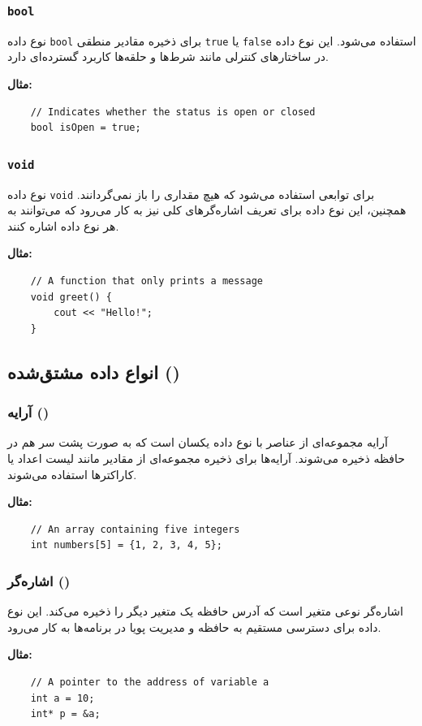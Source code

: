 \documentclass[12pt, a4paper]{report}
\begin{document}
\subsubsection{\texttt{bool}}
نوع داده \texttt{bool} برای ذخیره مقادیر منطقی \texttt{true} یا \texttt{false} استفاده می‌شود. این نوع داده در ساختارهای کنترلی مانند شرط‌ها و حلقه‌ها کاربرد گسترده‌ای دارد.

\textbf{مثال:}
\LTR
\begin{lstlisting}
	// Indicates whether the status is open or closed
	bool isOpen = true;
\end{lstlisting}
\RTL
\subsubsection{\texttt{void}}
نوع داده \texttt{void} برای توابعی استفاده می‌شود که هیچ مقداری را باز نمی‌گردانند. همچنین، این نوع داده برای تعریف اشاره‌گرهای کلی نیز به کار می‌رود که می‌توانند به هر نوع داده اشاره کنند.

\textbf{مثال:}
\LTR
\begin{lstlisting}
	// A function that only prints a message
	void greet() {
		cout << "Hello!";
	}
\end{lstlisting}
\RTL
\subsection{ انواع داده مشتق‌شده ()}

\subsubsection{ آرایه ()}
آرایه مجموعه‌ای از عناصر با نوع داده یکسان است که به صورت پشت سر هم در حافظه ذخیره می‌شوند. آرایه‌ها برای ذخیره مجموعه‌ای از مقادیر مانند لیست اعداد یا کاراکترها استفاده می‌شوند.

\textbf{مثال:}
\LTR
\begin{lstlisting}
	// An array containing five integers
	int numbers[5] = {1, 2, 3, 4, 5};
\end{lstlisting}
\RTL
\subsubsection{ اشاره‌گر ()}
اشاره‌گر نوعی متغیر است که آدرس حافظه یک متغیر دیگر را ذخیره می‌کند. این نوع داده برای دسترسی مستقیم به حافظه و مدیریت پویا در برنامه‌ها به کار می‌رود.

\textbf{مثال:}
\LTR
\begin{lstlisting}
	// A pointer to the address of variable a
	int a = 10;
	int* p = &a;
\end{lstlisting}
\RTL
\end{document}
